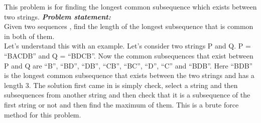\documentclass[12pt]{book}
\begin{document}
This problem is for finding the longest common subsequence which exists between two strings.\newline
\textbf{\textit{Problem statement:}}\\
Given two sequences , find the length of the longest subsequence that is common in both of them.\\
Let’s understand this with an example.\newline\newline
Let’s consider two strings P and Q. P = “BACDB” and Q = “BDCB”. Now the common subsequences that exist between P and Q are “B”, “BD”, “DB”, “CB”, “BC”, “D”, “C” and “BDB”. Here “BDB” is the longest common subsequence that exists between the two strings and has a length 3.
The solution first came in is simply check, select a string and then subsequences from another string and then check that it is a subsequence of the first string or not and then find the maximum of them. This is a brute force method for this problem.\newline
\end{document}
